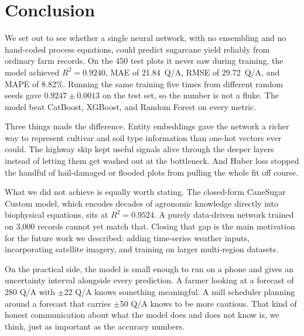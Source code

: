 \documentclass[conference,10pt,letterpaper]{IEEEtran}
\begin{document}
\section{Conclusion}

We set out to see whether a single neural network, with no ensembling and no hand-coded process equations, could predict sugarcane yield reliably from ordinary farm records. On the 450 test plots it never saw during training, the model achieved $R^2 = 0.9240$, MAE of 21.84~Q/A, RMSE of 29.72~Q/A, and MAPE of 8.82\%. Running the same training five times from different random seeds gave $0.9247 \pm 0.0013$ on the test set, so the number is not a fluke. The model beat CatBoost, XGBoost, and Random Forest on every metric.

Three things made the difference. Entity embeddings gave the network a richer way to represent cultivar and soil type information than one-hot vectors ever could. The highway skip kept useful signals alive through the deeper layers instead of letting them get washed out at the bottleneck. And Huber loss stopped the handful of hail-damaged or flooded plots from pulling the whole fit off course.

What we did not achieve is equally worth stating. The closed-form CaneSugar Custom model, which encodes decades of agronomic knowledge directly into biophysical equations, sits at $R^2 = 0.9524$. A purely data-driven network trained on 3,000 records cannot yet match that. Closing that gap is the main motivation for the future work we described: adding time-series weather inputs, incorporating satellite imagery, and training on larger multi-region datasets.

On the practical side, the model is small enough to run on a phone and gives an uncertainty interval alongside every prediction. A farmer looking at a forecast of 280 Q/A with $\pm$22 Q/A knows something meaningful. A mill scheduler planning around a forecast that carries $\pm$50 Q/A knows to be more cautious. That kind of honest communication about what the model does and does not know is, we think, just as important as the accuracy numbers.
\end{document}
